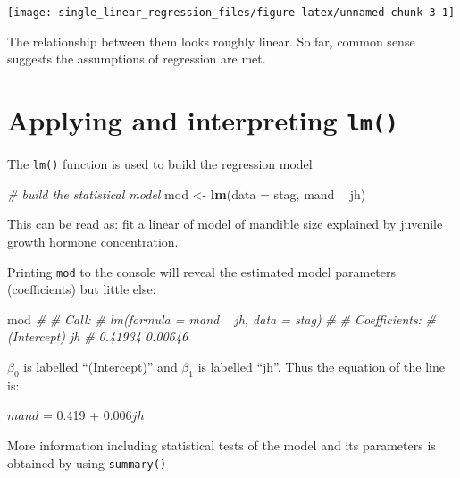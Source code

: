 \documentclass[
]{book}
\newenvironment{Shaded}{\begin{snugshade}}{\end{snugshade}}
\newcommand{\CommentTok}[1]{\textcolor[rgb]{0.56,0.35,0.01}{\textit{#1}}}
\newcommand{\DataTypeTok}[1]{\textcolor[rgb]{0.13,0.29,0.53}{#1}}
\newcommand{\KeywordTok}[1]{\textcolor[rgb]{0.13,0.29,0.53}{\textbf{#1}}}
\newcommand{\NormalTok}[1]{#1}
\newcommand{\OperatorTok}[1]{\textcolor[rgb]{0.81,0.36,0.00}{\textbf{#1}}}
\newcommand{\StringTok}[1]{\textcolor[rgb]{0.31,0.60,0.02}{#1}}
\begin{document}
\begin{flushleft}\texttt{[image: single\_linear\_regression\_files/figure-latex/unnamed-chunk-3-1]} \end{flushleft}

The relationship between them looks roughly linear. So far, common sense suggests the assumptions of regression are met.

\hypertarget{applying-and-interpreting-lm}{%
\section{\texorpdfstring{Applying and interpreting \texttt{lm()}}{Applying and interpreting lm()}}\label{applying-and-interpreting-lm}}

The \texttt{lm()} function is used to build the regression model

\begin{Shaded}
\begin{Highlighting}[]
\CommentTok{# build the statistical model}
\NormalTok{mod <-}\StringTok{ }\KeywordTok{lm}\NormalTok{(}\DataTypeTok{data =}\NormalTok{ stag, mand }\OperatorTok{~}\StringTok{ }\NormalTok{jh)}
\end{Highlighting}
\end{Shaded}

This can be read as: fit a linear of model of mandible size explained by juvenile growth hormone concentration.

Printing \texttt{mod} to the console will reveal the estimated model parameters (coefficients) but little else:

\begin{Shaded}
\begin{Highlighting}[]
\NormalTok{mod}
\CommentTok{# }
\CommentTok{# Call:}
\CommentTok{# lm(formula = mand ~ jh, data = stag)}
\CommentTok{# }
\CommentTok{# Coefficients:}
\CommentTok{# (Intercept)           jh  }
\CommentTok{#     0.41934      0.00646}
\end{Highlighting}
\end{Shaded}

\(\beta_{0}\) is labelled ``(Intercept)'' and \(\beta_{1}\) is labelled ``jh''. Thus the equation of the line is:

\(mand\) = 0.419 + 0.006\(jh\)

More information including statistical tests of the model and its parameters is obtained by using \texttt{summary()}
\end{document}
